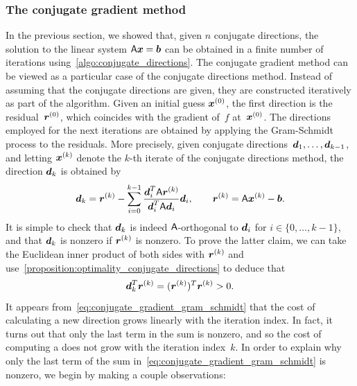 \subsubsection{The conjugate gradient method}%
\label{ssub:the_conjugate_gradient_method}
In the previous section,
we showed that, given $n$ conjugate directions,
the solution to the linear system $\mathsf A \mathbf{\boldsymbol{x}} = \mathbf{\boldsymbol{b}}$ can be obtained in a finite number of iterations using~\cref{algo:conjugate_directions}.
The conjugate gradient method can be viewed as a particular case of the conjugate directions method.
Instead of assuming that the conjugate directions are given,
they are constructed iteratively as part of the algorithm.
Given an initial guess $\mathbf{\boldsymbol{x}}^{(0)}$,
the first direction is the residual~$\mathbf{\boldsymbol{r}}^{(0)}$,
which coincides with the gradient of~$f$ at~$\mathbf{\boldsymbol{x}}^{(0)}$.
The directions employed for the next iterations are obtained by applying the Gram-Schmidt process
to the residuals.
More precisely, given conjugate directions~$\mathbf{\boldsymbol{d}}_1, \dotsc, \mathbf{\boldsymbol{d}}_{k-1}$,
and letting $\mathbf{\boldsymbol{x}}^{(k)}$ denote the $k$-th iterate of the conjugate directions method,
the direction $\mathbf{\boldsymbol{d}}_k$ is obtained by
\begin{equation}
    \label{eq:conjugate_gradient_gram_schmidt}
    \mathbf{\boldsymbol{d}}_k = \mathbf{\boldsymbol{r}}^{(k)} - \sum_{i=0}^{k-1} \frac{\mathbf{\boldsymbol{d}}_i^T \mathsf A \mathbf{\boldsymbol{r}}^{(k)}}{\mathbf{\boldsymbol{d}}_i^T \mathsf A \mathbf{\boldsymbol{d}}_i} \mathbf{\boldsymbol{d}}_i,
    \qquad \mathbf{\boldsymbol{r}}^{(k)} = \mathsf A \mathbf{\boldsymbol{x}}^{(k)} - \mathbf{\boldsymbol{b}}.
\end{equation}
It is simple to check that $\mathbf{\boldsymbol{d}}_k$  is indeed $\mathsf A$-orthogonal to $\mathbf{\boldsymbol{d}}_i$ for $i \in \{0, \dotsc, k-1\}$,
and that $\mathbf{\boldsymbol{d}}_k$ is nonzero if $\mathbf{\boldsymbol{r}}^{(k)}$ is nonzero.
To prove the latter claim,
we can take the Euclidean inner product of both sides with $\mathbf{\boldsymbol{r}}^{(k)}$ and use~\cref{proposition:optimality_conjugate_directions}
to deduce that
\begin{equation}
    \label{eq:conjugate_gradient_positive_omega}
    \mathbf{\boldsymbol{d}}_k^T \mathbf{\boldsymbol{r}}^{(k)} = (\mathbf{\boldsymbol{r}}^{(k)} )^T \mathbf{\boldsymbol{r}}^{(k)} > 0.
\end{equation}
It appears from~\eqref{eq:conjugate_gradient_gram_schmidt} that the cost of calculating a new direction grows linearly with the iteration index.
In fact, it turns out that only the last term in the sum is nonzero,
and so the cost of computing a does not grow with the iteration index~$k$.
In order to explain why only the last term of the sum in~\eqref{eq:conjugate_gradient_gram_schmidt} is nonzero,
we begin by making a couple observations:
